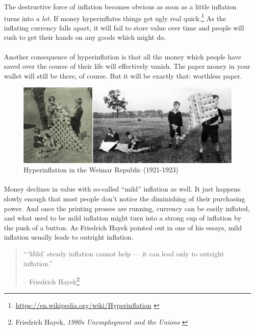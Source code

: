 The destructive force of inflation becomes obvious as soon as a little inflation
turns into \textit{a lot}. If money hyperinflates things get ugly real
quick.\footnote{\url{https://en.wikipedia.org/wiki/Hyperinflation}
\cite{wiki:hyperinflation}} As the inflating currency falls apart, it will fail
to store value over time and people will rush to get their hands on any goods
which might do.

\paragraph{}
Another consequence of hyperinflation is that all the money which people
have saved over the course of their life will effectively vanish. The
paper money in your wallet will still be there, of course. But it will
be exactly that: worthless paper.

\begin{figure}
  \includegraphics{assets/images/children-playing-with-money.png}
  \caption{Hyperinflation in the Weimar Republic (1921-1923)}
  \label{fig:children-playing-with-money}
\end{figure}

\paragraph{}
Money declines in value with so-called \enquote{mild} inflation as well. It
just happens slowly enough that most people don't notice the diminishing
of their purchasing power. And once the printing presses are running,
currency can be easily inflated, and what used to be mild inflation
might turn into a strong cup of inflation by the push of a button. As
Friedrich Hayek pointed out in one of his essays, mild inflation usually
leads to outright inflation.

\begin{quotation}\begin{samepage}
\enquote{`Mild' steady inflation cannot help --- it can lead only to outright
inflation.}
\begin{flushright} -- Friedrich Hayek\footnote{Friedrich Hayek, \textit{1980s
Unemployment and the Unions} \cite{hayek-inflation}}
\end{flushright}\end{samepage}\end{quotation}

